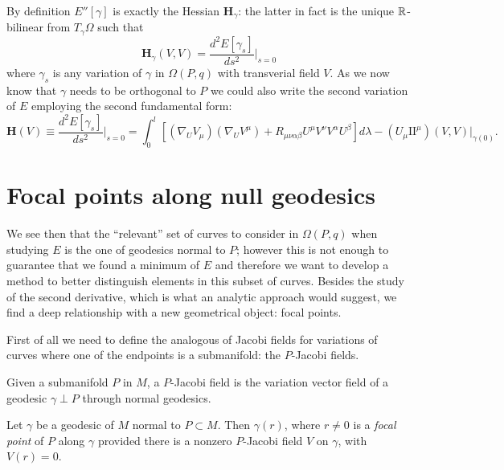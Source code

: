 By definition \(E''[\gamma]\) is exactly the Hessian \(\textbf{H}_{\gamma}\): the latter in fact is the unique \({\mathbb{R}}\)-bilinear from \(T_{\gamma}\Omega\) such that 
\[
\textbf{H}_{\gamma}(V, V) = \frac{d^2E[\gamma_s]}{ds^2}\Big\vert_{s = 0}
\]
where \(\gamma_s\) is any variation of \(\gamma\) in \(\Omega(P, q)\) with transverial field \(V\).
As we now know that \(\gamma\) needs to be orthogonal to \(P\) we could also write the second variation of \(E\) employing the second fundamental form:
\begin{equation}
	\label{eq:hessian}
	\textbf{H}(V) \equiv\frac{d^2E[\gamma_s]}{ds^2}\Big\vert_{s = 0} = 
	\int_{0}^{l} \left[(\nabla_UV_{\mu})(\nabla_UV^{\mu}) + R_{\mu\nu\alpha\beta}U^{\mu}V^{\nu}V^{\alpha}U^{\beta}\right] d\lambda - (U_{\mu}\mathrm{I\!I}^{\mu})(V, V)\Big\vert_{\gamma(0)}.
\end{equation}

\section{Focal points along null geodesics}
We see then that the ``relevant'' set of curves to consider in \(\Omega(P, q)\) when studying \(E\) is the one of geodesics normal to \(P\); however this is not enough to guarantee that we found a minimum of \(E\) and therefore we want to develop a method to better distinguish elements in this subset of curves. Besides the study of the second derivative, which is what an analytic approach would suggest, we find a deep relationship with a new geometrical object: focal points.

\vskip 4pt

First of all we need to define the analogous of Jacobi fields for variations of curves where one of the endpoints is a submanifold: the \(P\)-Jacobi fields.
\begin{definition}
	Given a submanifold \(P\) in \(M\), a \(P\)-Jacobi field is the variation vector field of a geodesic \(\gamma \perp P\) through normal geodesics.
\end{definition}


\begin{definition}
	Let \(\gamma\) be a geodesic of \(M\) normal to \(P \subset M\). Then \(\gamma(r)\), where \(r \neq 0\) is a \emph{focal point} of \(P\) along \(\gamma\) provided there is a nonzero \(P\)-Jacobi field \(V\) on \(\gamma\), with \(V(r) = 0\).
\end{definition}

